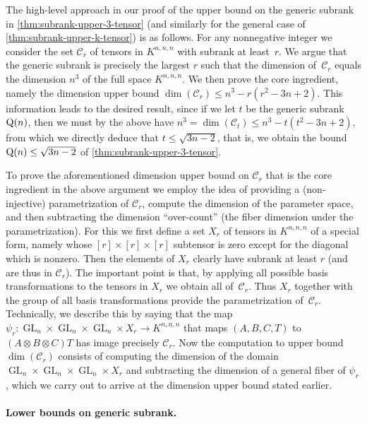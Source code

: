 \documentclass[10pt,a4paper]{article}
\theoremstyle{definition}
\theoremstyle{remark}
\newcommand{\gensubrank}{{\rm Q}}
\newcommand{\GL}{\operatorname{GL}}
\begin{document}
The high-level approach in our proof of the upper bound on the generic subrank in \autoref{thm:subrank-upper-3-tensor} (and similarly for the general case of \autoref{thm:subrank-upper-k-tensor}) is as follows. For any nonnegative integer we consider the set $\mathcal{C}_r$ of tensors in $K^{n,n,n}$ with subrank at least~$r$. We argue that the generic subrank is precisely the largest $r$ such that the dimension of~$\mathcal{C}_r$ equals the dimension $n^3$ of the full space $K^{n,n,n}$. We then prove the core ingredient, namely the dimension upper bound $\dim(\mathcal{C}_r) \leq n^3 - r(r^2 - 3n + 2)$. This information leads to the desired result, since if we let $t$ be the generic subrank $\gensubrank(n)$, then we must by the above have $n^3 = \dim(\mathcal{C}_t) \leq n^3 - t(t^2 - 3n + 2)$, from which we directly deduce that $t\leq \sqrt{3n - 2}$, that is, we obtain the bound $\gensubrank(n) \leq \sqrt{3n-2}$ of \autoref{thm:subrank-upper-3-tensor}.

To prove the aforementioned dimension upper bound on $\mathcal{C}_r$ that is the core ingredient in the above argument we employ the idea of providing a (non-injective) parametrization of $\mathcal{C}_r$, compute the dimension of the parameter space, and then subtracting the dimension ``over-count'' (the fiber dimension under the parametrization). 
%
For this we first define a set $X_r$ of tensors in $K^{n,n,n}$ of a special form, namely whose $[r]\times [r]\times [r]$ subtensor is zero except for the diagonal which is nonzero. Then the elements of $X_r$ clearly have subrank at least $r$ (and are thus in $\mathcal{C}_r$). 
The important point is that, by applying all possible basis transformations to the tensors in $X_r$ we obtain all of~$\mathcal{C}_r$.
Thus $X_r$ together with the group of all basis transformations provide the parametrization of~$\mathcal{C}_r$.
Technically, we describe this by saying that the map $\psi_r : \GL_n \times \GL_n \times \GL_n \times X_r \to K^{n,n,n}$ that maps $(A, B, C, T)$ to $(A \otimes B \otimes C)T$ has image precisely $\mathcal{C}_r$. Now the computation to upper bound $\dim(\mathcal{C}_r)$ consists of computing the dimension of the domain $\GL_n \times \GL_n \times \GL_n \times X_r$ and subtracting the dimension of a general fiber of $\psi_r$, which we carry out to arrive at the dimension upper bound stated earlier.

\paragraph{Lower bounds on generic subrank.}
\end{document}
